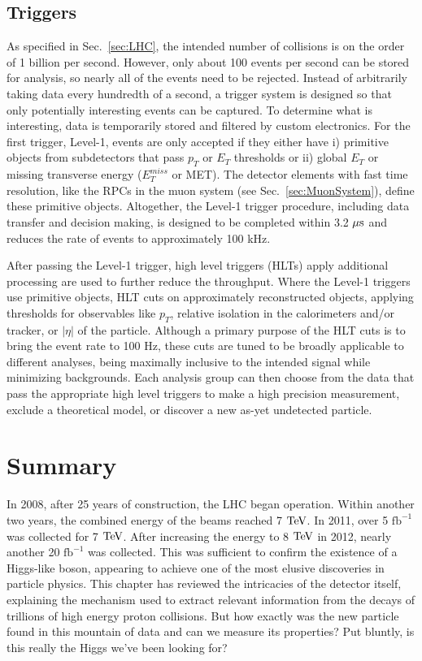\subsection{Triggers}
\label{sec:Triggers}

As specified in Sec.~\ref{sec:LHC}, the intended number of collisions is on the order of 1 billion per second. However, only about 100 events per second can be stored for analysis, so nearly all of the events need to be rejected. Instead of arbitrarily taking data every hundredth of a second, a trigger system is designed so that only potentially interesting events can be captured. To determine what is interesting, data is temporarily stored and filtered by custom electronics. For the first trigger, Level-1, events are only accepted if they either have i) primitive objects from subdetectors that pass $p_T$ or $E_T$ thresholds or ii) global $E_T$ or missing transverse energy ($E_T^{miss}$ or MET). The detector elements with fast time resolution, like the RPCs in the muon system (see Sec.~\ref{sec:MuonSystem}), define these primitive objects. Altogether, the Level-1 trigger procedure, including data transfer and decision making, is designed to be completed within 3.2 $\mu\rm{s}$ and reduces the rate of events to approximately 100 kHz.

After passing the Level-1 trigger, high level triggers (HLTs) apply additional processing are used to further reduce the throughput. Where the Level-1 triggers use primitive objects, HLT cuts on approximately reconstructed objects, applying thresholds for observables like $p_T$, relative isolation in the calorimeters and/or tracker, or $|\eta|$ of the particle. Although a primary purpose of the HLT cuts is to bring the event rate to 100 Hz, these cuts are tuned to be broadly applicable to different analyses, being maximally inclusive to the intended signal while minimizing backgrounds. Each analysis group can then choose from the data that pass the appropriate high level triggers to make a high precision measurement, exclude a theoretical model, or discover a new as-yet undetected particle.

\section{Summary}
\label{sec:expt_summary}

In 2008, after 25 years of construction, the LHC began operation. Within another two years, the combined energy of the beams reached 7 $\rm{TeV}$. In 2011, over 5 $\mathrm{fb}^{-1}$ was collected for 7 $\rm{TeV}$. After increasing the energy to 8 $\rm{TeV}$ in 2012, nearly another 20 $\mathrm{fb}^{-1}$ was collected. This was sufficient to confirm the existence of a Higgs-like boson, appearing to achieve one of the most elusive discoveries in particle physics. This chapter has reviewed the intricacies of the detector itself, explaining the mechanism used to extract relevant information from the decays of trillions of high energy proton collisions. But how exactly was the new particle found in this mountain of data and can we measure its properties? Put bluntly, is this really the Higgs we've been looking for?